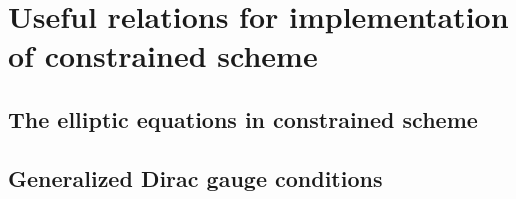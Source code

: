 \chapter{Useful relations for implementation of constrained scheme}

\section{The elliptic equations in constrained scheme}
\section{Generalized Dirac gauge conditions}
